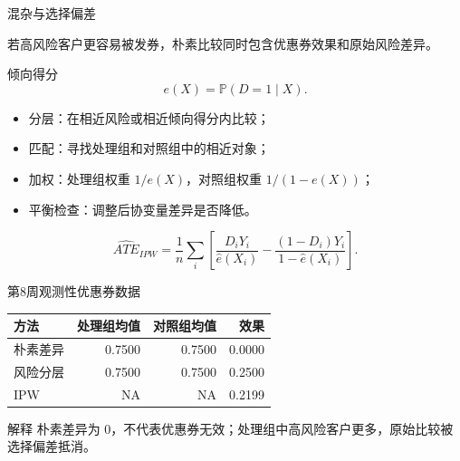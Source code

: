 \documentclass[UTF8,fontset=fandol,aspectratio=169,11pt]{ctexbeamer}
\begin{document}
\begin{frame}{混杂与选择偏差}
\begin{center}
\end{center}
\small
若高风险客户更容易被发券，朴素比较同时包含优惠券效果和原始风险差异。
\end{frame}

\begin{frame}{倾向得分}
\[
  e(X)=\mathbb P(D=1\mid X).
\]
\begin{itemize}
  \item 分层：在相近风险或相近倾向得分内比较；
  \item 匹配：寻找处理组和对照组中的相近对象；
  \item 加权：处理组权重 \(1/e(X)\)，对照组权重 \(1/(1-e(X))\)；
  \item 平衡检查：调整后协变量差异是否降低。
\end{itemize}
\[
  \widehat{ATE}_{IPW}
  =
  \frac{1}{n}\sum_i
  \left[
    \frac{D_iY_i}{\hat e(X_i)}
    -
    \frac{(1-D_i)Y_i}{1-\hat e(X_i)}
  \right].
\]
\end{frame}

\begin{frame}{第8周观测性优惠券数据}
\begin{center}
\begin{tabular}{lrrr}
\toprule
方法 & 处理组均值 & 对照组均值 & 效果\\
\midrule
朴素差异 & 0.7500 & 0.7500 & 0.0000\\
风险分层 & 0.7500 & 0.7500 & 0.2500\\
IPW & NA & NA & 0.2199\\
\bottomrule
\end{tabular}
\end{center}
\begin{block}{解释}
朴素差异为 0，不代表优惠券无效；处理组中高风险客户更多，原始比较被选择偏差抵消。
\end{block}
\end{frame}
\end{document}
